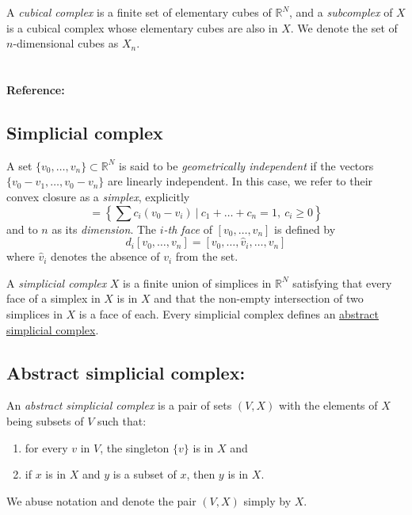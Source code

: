 \documentclass{amsart}
\begin{document}
	A \textit{cubical complex} is a finite set of elementary cubes of $\mathbb{R}^N$, and a \textit{subcomplex} of $X$ is a cubical complex whose elementary cubes are also in $X$. We denote the set of $n$-dimensional cubes as $X_n$.
	
	\paragraph{\\ Reference:} \cite{mischaikow04computational}
	
	\subsection*{Simplicial complex} \label{simplicial complex}
	
	A set $\{v_0, \dots, v_n\} \subset \mathbb{R}^N$ is said to be \textit{geometrically independent} if the vectors $\{v_0-v_1, \dots, v_0-v_n\}$ are linearly independent. In this case, we refer to their convex closure as a \textit{simplex}, explicitly
	\begin{equation*}
	[v_0,\dots ,v_n] = \left\{ \sum c_i (v_0 - v_i)\ \big|\ c_1+\dots+c_n = 1,\ c_i \geq 0 \right\}
	\end{equation*}
	and to $n$ as its \textit{dimension}. The \textit{$i$-th face} of $[v_0, \dots, v_n]$ is defined by
	\begin{equation*}
	d_i[v_0, \dots, v_n] = [v_0, \dots, \widehat{v}_i, \dots, v_n]
	\end{equation*}
	where $\widehat{v}_i$ denotes the absence of $v_i$ from the set.
	
	A \textit{simplicial complex} $X$ is a finite union of simplices in $\mathbb{R}^N$ satisfying that every face of a simplex in $X$ is in $X$ and that the non-empty intersection of two simplices in $X$ is a face of each. Every simplicial complex defines an \hyperref[abstract simplicial complex]{abstract simplicial complex}.
	
	\subsection*{Abstract simplicial complex:} \label{abstract simplicial complex}
	
	An \textit{abstract simplicial complex} is a pair of sets $(V, X)$ with the elements of $X$ being subsets of $V$ such that: 
	\begin{enumerate}
		\item for every $v$ in $V$, the singleton $\{v\}$ is in $X$ and
		\item if $x$ is in $X$ and $y$ is a subset of $x$, then $y$ is in $X$. 
	\end{enumerate}
	We abuse notation and denote the pair $(V, X)$ simply by $X$.
	
\end{document}

